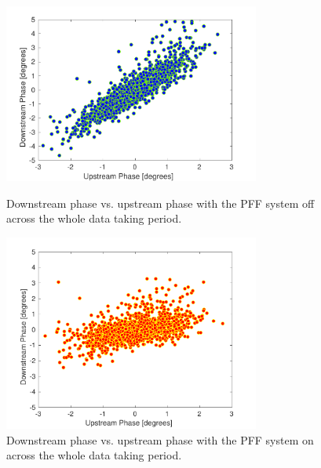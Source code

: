 \begin{figure}
  \centering
  \includegraphics[width=0.75\textwidth]{Figures/feedforward/longFF_scatterFFOff}
  \caption{Downstream phase vs. upstream phase with the PFF system off across the whole data taking period.}
  \label{f:longFF_scatterFFOff}

  \includegraphics[width=0.75\textwidth]{Figures/feedforward/longFF_scatterFFOn}
  \caption{Downstream phase vs. upstream phase with the PFF system on across the whole data taking period.}
  \label{f:longFF_scatterFFOn}
\end{figure}


